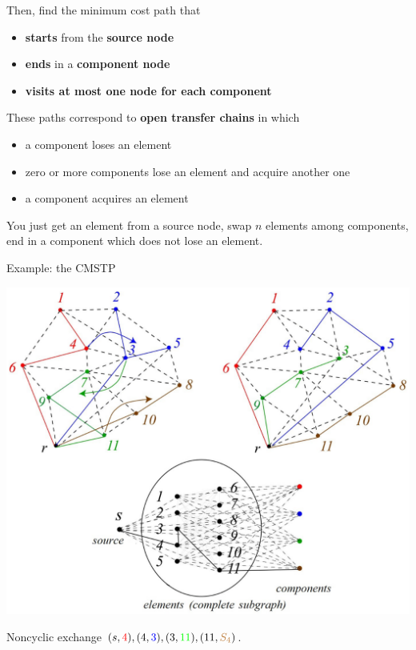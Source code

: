 Then, find the minimum cost path that
\begin{itemize}
	\item \textbf{starts} from the \textbf{source node}
	
	\item \textbf{ends} in a \textbf{component node}
	
	\item \textbf{visits at most one node for each component}
\end{itemize}

These paths correspond to \textbf{open transfer chains} in which
\begin{itemize}
	\item a component loses an element
	
	\item zero or more components lose an element and acquire another one
	
	\item a component acquires an element
\end{itemize}

You just get an element from a source node, swap $n$ elements among components, end in a component which does not lose an element.\\

\newpage

Example: the CMSTP
\begin{center}
	\includegraphics[width=0.9\columnwidth]{img/CMSTP2}
\end{center}
Noncyclic exchange $(s, {\color{red} 4}), (4, {\color{blue} 3}), (3, {\color{green} 11}), (11, {\color{brown} S_4})$.\\

